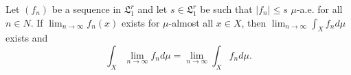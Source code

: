 Let $(f_n)$ be a sequence in $\mathfrak{L}_1^r$ and let $s \in \mathfrak{L}_1^r$ be such that $|f_n| \leq s$ $\mu$-a.e. for all $n \in N$. If $\lim_{n \to \infty} f_n(x)$ exists for $\mu$-almost all $x \in X$, then $\lim_{n \to \infty} \int_X f_n d\mu$ exists and $$\int_X \lim_{n \to \infty} f_n d\mu = \lim_{n \to \infty} \int_X f_n d\mu.$$
